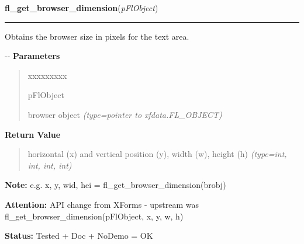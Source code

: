 \hspace{.8\funcindent}\begin{boxedminipage}{\funcwidth}

    \raggedright \textbf{fl\_get\_browser\_dimension}(\textit{pFlObject})

    \vspace{-1.5ex}

    \rule{\textwidth}{0.5\fboxrule}
\setlength{\parskip}{2ex}

Obtains the browser size in pixels for the text area.

-{}-
\setlength{\parskip}{1ex}
      \textbf{Parameters}
      \vspace{-1ex}

      \begin{quote}
        \begin{Ventry}{xxxxxxxxx}

          \item[pFlObject]


browser object
            {\it (type=pointer to xfdata.FL\_OBJECT)}

        \end{Ventry}

      \end{quote}

      \textbf{Return Value}
    \vspace{-1ex}

      \begin{quote}

horizontal (x) and vertical position (y), width (w), height (h)
      {\it (type=int, int, int, int)}

      \end{quote}

\textbf{Note:} 
e.g. x, y, wid, hei = fl\_get\_browser\_dimension(brobj)


\textbf{Attention:} 
API change from XForms - upstream was
fl\_get\_browser\_dimension(pFlObject, x, y, w, h)


\textbf{Status:} 
Tested + Doc + NoDemo = OK


    \end{boxedminipage}

    \label{xformslib:flbrowser:fl_set_browser_dblclick_callback}

    \vspace{0.5ex}

